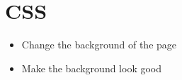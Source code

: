 \part{CSS}\label{part:css}

\begin{itemize}
    \item Change the background of the page
    \item Make the background look good
\end{itemize}
